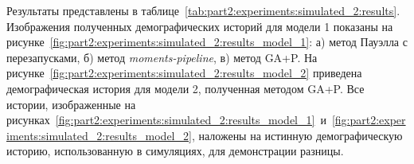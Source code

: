Результаты представлены в таблице~\ref{tab:part2:experiments:simulated_2:results}. Изображения полученных демографических историй для модели 1 показаны на рисунке~\ref{fig:part2:experiments:simulated_2:results_model_1}: а) метод Пауэлла с перезапусками, б) метод \textit{moments-pipeline}, в) метод GA+P.
На рисунке~\ref{fig:part2:experiments:simulated_2:results_model_2} приведена демографическая история для модели 2, полученная методом GA+P.
Все истории, изображенные на рисунках~\ref{fig:part2:experiments:simulated_2:results_model_1}~и~\ref{fig:part2:experiments:simulated_2:results_model_2}, наложены на истинную демографическую историю, использованную в симуляциях, для демонстрации разницы.

\begin{table}[ht!]
    \caption{Результаты 50 повторов тестируемых методов настройки параметров для моделей демографической истории двух популяций}
    \label{tab:part2:experiments:simulated_2:results}
\end{table}

